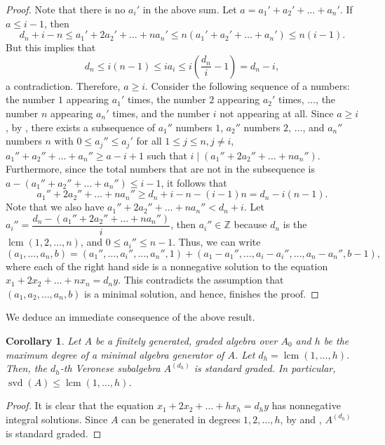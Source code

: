 \documentclass[12pt]{amsart}
\numberwithin{equation}{section}
\newtheorem{corollary}[theorem]{Corollary}
\theoremstyle{definition}
\DeclareMathOperator{\lcm}{lcm}
\DeclareMathOperator{\svd}{svd}
\newcommand{\ZZ}{{\mathbb Z}}
\begin{document}
\begin{proof}
    Note that there is no $a_i'$ in the above sum. Let $a=a_1'+a_2'+\ldots +a_n'$. If $a\le i-1$, then
    \[
    d_n+i-n \le a_1'+2a_2'+\ldots + na_n'\le n(a_1'+a_2'+\ldots +a_n')\le n(i-1).
    \]
    But this implies that
    \[
    d_n \le i(n-1) \le ia_i \le i\left(\dfrac{d_n}{i}-1 \right) = d_n-i,
    \]
    a contradiction. Therefore, $a\ge i$. Consider the following sequence of a numbers: the number $1$ appearing $a_1'$ times, the number $2$ appearing $a_2'$ times, $\ldots$, the number $n$ appearing $a_n'$ times, and the number $i$ not appearing at all. Since $a\ge i$, by , there exists a subsequence of $a_1''$ numbers $1$, $a_2''$ numbers $2$, $\ldots$, and $a_n''$ numbers $n$ with $0\le a_j''\le a_j'$ for all $1\le j \le n, j\ne i$, $a_1''+a_2''+\ldots+ a_n'' \ge a-i+1$ such that $i \mid (a_1''+2a_2''+ \ldots+ na_n'')$. Furthermore, since the total numbers that are not in the subsequence is $a-(a_1''+a_2''+ \ldots+ a_n'') \le i-1$, it follows that
    \[
    a_1''+2a_2''+ \ldots+ na_n'' \ge d_n+i-n - (i-1)n =  d_n-i(n-1). 
    \]
    Note that we also have $a_1''+2a_2''+ \ldots+ na_n'' < d_n+i$. Let $a_i''=\dfrac{d_n-(a_1''+2a_2''+ \ldots+ na_n'')}{i}$, then $a_i'' \in \ZZ$ because $d_n$ is the $\lcm(1,2,\ldots,n)$, and $0 \le a_i'' \le n-1$. Thus, we can write
    $$(a_1,\ldots ,a_n,b) = (a_1'',\ldots, a_i'', \ldots,a_n'',1)+(a_1-a_1'',\ldots, a_i-a_i'', \ldots, a_n-a_n'',b-1),$$
    where each of the right hand side is a nonnegative solution to the equation $x_1+2x_2+\ldots +nx_n=d_ny$. This contradicts the assumption that $(a_1,a_2,\ldots ,a_n,b)$ is a minimal solution, and hence, finishes the proof.    
\end{proof}

We deduce an immediate consequence of the above result.

\begin{corollary}
    \label{cor.SVDAlgebra}
    Let $A$ be a finitely generated, graded algebra over $A_0$ and $h$ be the maximum degree of a minimal algebra generator of $A$. Let $d_h= \lcm(1,\ldots,h)$. Then, the $d_h$-th Veronese subalgebra $A^{(d_h)}$ is standard graded. In particular, $\svd(A) \leq \lcm(1,\ldots,h)$.
\end{corollary}

\begin{proof}
    It is clear that the equation $x_1+2x_2+\ldots +hx_h=d_hy$ has nonnegative integral solutions. Since $A$ can be generated in degrees $1, 2, \ldots ,h$, by  and , $A^{(d_h)}$ is standard graded.
\end{proof}
\end{document}
